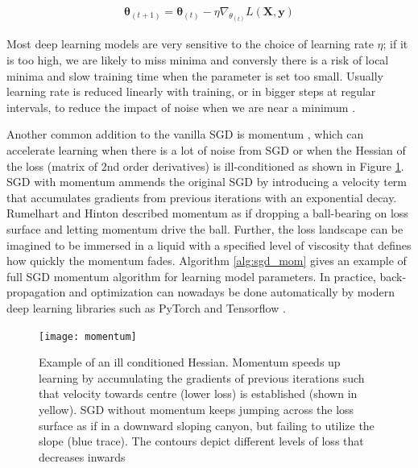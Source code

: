 \documentclass[12pt]{report}
\begin{document}
\begin{align} \label{sgd_eq}
  \pmb{\theta}_{(t+1)}=\pmb{\theta}_{(t)} - \eta \nabla_{\theta_{(t)}}L(\mathbf{X}, \mathbf{y})
\end{align}

Most deep learning models are very sensitive to the choice of learning rate $\eta$; if it is too high, we are likely to miss minima and conversly there is a risk of local minima and slow training time when the parameter is set too small. Usually learning rate is reduced linearly with training, or in bigger steps at regular intervals, to reduce the impact of noise when we are near a minimum \cite{Goodfellow2016}.

Another common addition to the vanilla SGD is momentum \cite{Rumelhart1985}, which can accelerate learning when there is a lot of noise from SGD or when the Hessian of the loss (matrix of 2nd order derivatives) is ill-conditioned as shown in Figure \ref{fig:momentum}. SGD with momentum ammends the original SGD by introducing a velocity term that accumulates gradients from previous iterations with an exponential decay. Rumelhart and Hinton \cite{Rumelhart1985} described momentum as if dropping a ball-bearing on loss surface and letting momentum drive the ball. Further, the loss landscape can be imagined to be immersed in a liquid with a specified level of viscosity that defines how quickly the momentum fades. Algorithm \ref{alg:sgd_mom} gives an example of full SGD momentum algorithm for learning model parameters. In practice, back-propagation and optimization can nowadays be done automatically by modern deep learning libraries such as PyTorch \cite{Paszke2017} and Tensorflow \cite{Abadi2015}. 

\begin{figure}
  \centering
	\texttt{[image: momentum]}
	\caption{Example of an ill conditioned Hessian. Momentum speeds up learning by accumulating the gradients of previous iterations such that velocity towards centre (lower loss) is established (shown in yellow). SGD without momentum keeps jumping across the loss surface as if in a downward sloping canyon, but failing to utilize the slope (blue trace). The contours depict different levels of loss that decreases inwards}
	\label{fig:momentum}
\end{figure}
\end{document}

